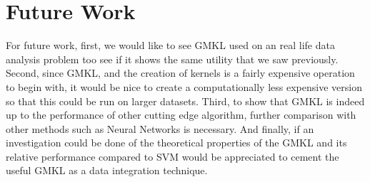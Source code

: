 \documentclass{article}
\begin{document}
\section{Future Work}
For future work, first, we would like to see GMKL used on an real life data analysis problem too see if it shows the same utility that we saw previously. Second, since GMKL, and the creation of kernels is a fairly expensive operation to begin with, it would be nice to create a computationally less expensive version so that this could be run on larger datasets. Third, to show that GMKL is indeed up to the performance of other cutting edge algorithm, further comparison with other methods such as Neural Networks is necessary. And finally, if an investigation could be done of the theoretical properties of the GMKL and its relative performance compared to SVM would be appreciated to cement the useful GMKL as a data integration technique.
\end{document}
